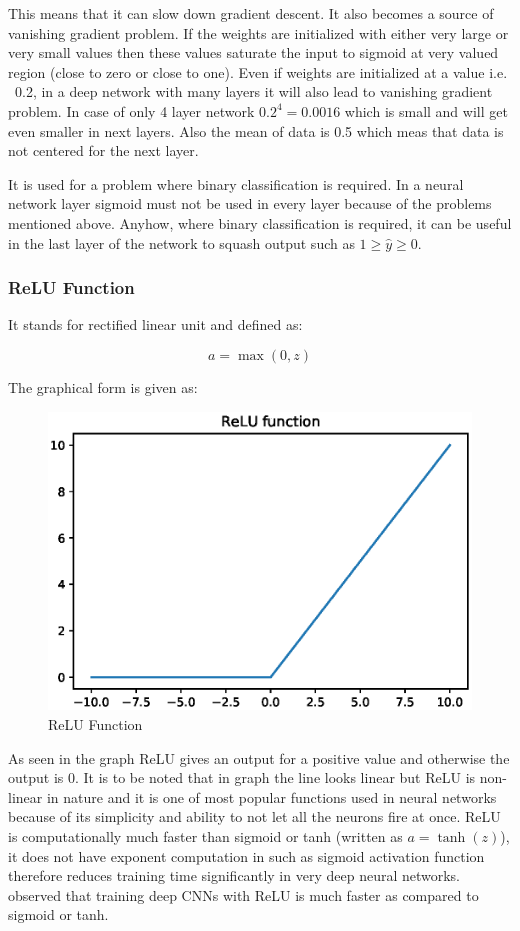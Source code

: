 \documentclass[11pt]{article}
\begin{document}
This means that it can slow down gradient descent. It also becomes a source of vanishing gradient problem. If the weights are initialized with either very large or very small values then these values saturate the input to sigmoid at very valued region (close to zero or close to one). Even if weights are initialized at a value i.e. ~0.2, in a deep network with many layers it will also lead to vanishing gradient problem. In case of only 4 layer network $0.2^{4}=0.0016$ which is small and will get even smaller in next layers. Also the mean of data is 0.5 which meas that data is not centered for the next layer. 

It is used for a problem where binary classification is required. In a neural network layer sigmoid must not be used in every layer because of the problems mentioned above. Anyhow, where binary classification is required, it can be useful in the last layer of the network to squash output such as $ 1 \geq \hat{y} \geq 0$.

\subsubsection{ReLU Function}
It stands for rectified linear unit and defined as:

\begin{equation}
a = \max (0, z)
\end{equation}

The graphical form is given as:

\begin{figure}[ht!]
	\centering
	\includegraphics[width=.6\linewidth]{files/cnn_architecture/relu.eps}
	\caption{ReLU Function}
	\label{fig: relu}
\end{figure}

As seen in the graph ReLU gives an output for a positive value and otherwise the output is 0. It is to be noted that in graph the line looks linear but ReLU is non-linear in nature and it is one of most popular functions used in neural networks because of its simplicity and ability to not let all the neurons fire at once. ReLU is computationally much faster than sigmoid or tanh (written as $a=\tanh (z)$), it does not have exponent computation in such as sigmoid activation function therefore reduces training time significantly in very deep neural networks. \cite{krizhevsky2012imagenet} observed that training deep CNNs with ReLU is much faster as compared to sigmoid or tanh. 
\end{document}
